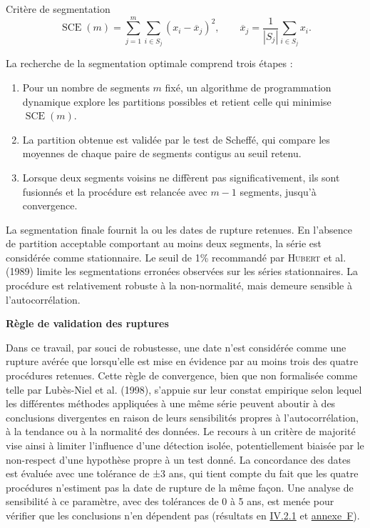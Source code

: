 \documentclass[12pt,a4paper]{report}
\begin{document}
\begin{formulabox}{Critère de segmentation}
\begin{equation}
\operatorname{SCE}(m)
=\sum_{j=1}^{m}\sum_{i\in S_j}
\left(x_i-\overline{x}_{j}\right)^2,
\qquad
\overline{x}_{j}=\frac{1}{|S_j|}\sum_{i\in S_j}x_i.
\label{eq:sce-hubert}
\end{equation}
\end{formulabox}

La recherche de la segmentation optimale comprend trois étapes :

\begin{enumerate}[label=\textbf{Étape \arabic*.},leftmargin=2.3cm]
\item Pour un nombre de segments $m$ fixé, un algorithme de programmation dynamique explore les partitions possibles et retient celle qui minimise $\operatorname{SCE}(m)$.
\item La partition obtenue est validée par le test de Scheffé, qui compare les moyennes de chaque paire de segments contigus au seuil retenu.
\item Lorsque deux segments voisins ne diffèrent pas significativement, ils sont fusionnés et la procédure est relancée avec $m-1$ segments, jusqu'à convergence.
\end{enumerate}

La segmentation finale fournit la ou les dates de rupture retenues. En l'absence de partition acceptable comportant au moins deux segments, la série est considérée comme stationnaire. Le seuil de 1\% recommandé par \textsc{Hubert} et al. (1989) limite les segmentations erronées observées sur les séries stationnaires. La procédure est relativement robuste à la non-normalité, mais demeure sensible à l'autocorrélation.

\par\medskip

\noindent\textbf{\color{navyblue}Règle de validation des ruptures}\par\nobreak\smallskip

Dans ce travail, par souci de robustesse, une date n’est considérée comme une rupture avérée que lorsqu’elle est mise en évidence par au moins trois des quatre procédures retenues. Cette règle de convergence, bien que non formalisée comme telle par Lubès-Niel et al. (1998), s’appuie sur leur constat empirique selon lequel les différentes méthodes appliquées à une même série peuvent aboutir à des conclusions divergentes en raison de leurs sensibilités propres à l’autocorrélation, à la tendance ou à la normalité des données. Le recours à un critère de majorité vise ainsi à limiter l’influence d’une détection isolée, potentiellement biaisée par le non-respect d’une hypothèse propre à un test donné. La concordance des dates est évaluée avec une tolérance de ±3 ans, qui tient compte du fait que les quatre procédures n’estiment pas la date de rupture de la même façon. Une analyse de sensibilité à ce paramètre, avec des tolérances de 0 à 5 ans, est menée pour vérifier que les conclusions n’en dépendent pas (résultats en \hyperref[sec:resultats-detection-ruptures]{IV.2.1} et \hyperref[tab:sensibilite-tolerance-ruptures]{annexe~F}).
\end{document}
